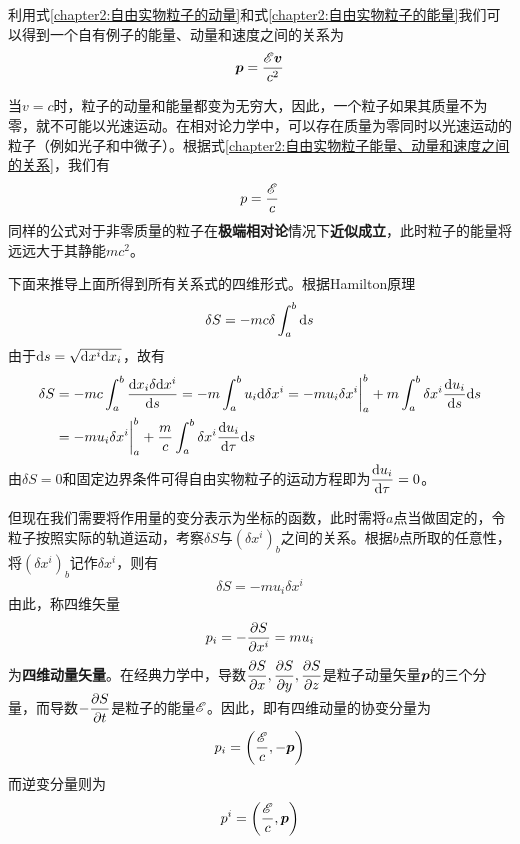 利用式\eqref{chapter2:自由实物粒子的动量}和式\eqref{chapter2:自由实物粒子的能量}我们可以得到一个自有例子的能量、动量和速度之间的关系为
\begin{equation}
	\boldsymbol{p} = \frac{\mathscr{E} \boldsymbol{v}}{c^2}
	\label{chapter2:自由实物粒子能量、动量和速度之间的关系}
\end{equation}

当$v=c$时，粒子的动量和能量都变为无穷大，因此，一个粒子如果其质量不为零，就不可能以光速运动。在相对论力学中，可以存在质量为零同时以光速运动的粒子（例如光子和中微子）。根据式\eqref{chapter2:自由实物粒子能量、动量和速度之间的关系}，我们有
\begin{equation}
	p = \frac{\mathscr{E}}{c}
\end{equation}
同样的公式对于非零质量的粒子在{\bf 极端相对论}情况下{\bf 近似成立}，此时粒子的能量将远远大于其静能$mc^2$。

下面来推导上面所得到所有关系式的四维形式。根据Hamilton原理
\begin{equation*}
	\delta S = -mc\delta\int_a^b \mathrm{d} s
\end{equation*}
由于$\mathrm{d} s = \sqrt{\mathrm{d} x^i\mathrm{d} x_i}$，故有
\begin{align}
	\delta S & = -mc\int_a^b \frac{\mathrm{d} x_i\delta \mathrm{d} x^i}{\mathrm{d} s} = -m\int_a^b u_i\mathrm{d} \delta x^i = -mu_i\delta x^i\bigg|_a^b + m\int_a^b \delta x^i \frac{\mathrm{d} u_i}{\mathrm{d} s}\mathrm{d} s \nonumber \\
	& = -mu_i\delta x^i\bigg|_a^b + \frac{m}{c}\int_a^b \delta x^i \frac{\mathrm{d} u_i}{\mathrm{d} \tau}\mathrm{d} s
	\label{chapter2.section2.1:作用量的变分}
\end{align}
由$\delta S = 0$和固定边界条件可得自由实物粒子的运动方程即为$\dfrac{\mathrm{d} u_i}{\mathrm{d} \tau} = 0$。

但现在我们需要将作用量的变分表示为坐标的函数，此时需将$a$点当做固定的，令粒子按照实际的轨道运动，考察$\delta S$与$(\delta x^i)_b$之间的关系。根据$b$点所取的任意性，将$(\delta x^i)_b$记作$\delta x^i$，则有
\begin{equation}
	\delta S = -mu_i\delta x^i
\end{equation}
由此，称四维矢量
\begin{equation}
	p_i = -\frac{\partial S}{\partial x^i} = mu_i
	\label{chapter2:四维动量矢量}
\end{equation}
为{\bf 四维动量矢量}。在经典力学中，导数$\dfrac{\partial S}{\partial x}, \dfrac{\partial S}{\partial y}, \dfrac{\partial S}{\partial z}$是粒子动量矢量$\boldsymbol{p}$的三个分量，而导数$-\dfrac{\partial S}{\partial t}$是粒子的能量$\mathscr{E}$。因此，即有四维动量的协变分量为
\begin{equation}
	p_i = \left(\frac{\mathscr{E}}{c},-\boldsymbol{p}\right)
	\label{chapter2:四维动量矢量的协变分量}
\end{equation}
而逆变分量则为
\begin{equation}
	p^i = \left(\frac{\mathscr{E}}{c},\boldsymbol{p}\right)
	\label{chapter2:四维动量矢量的逆变分量}
\end{equation}


